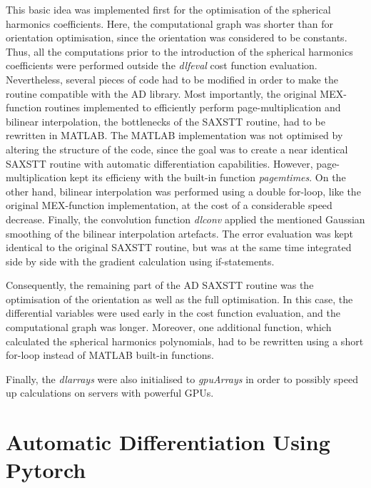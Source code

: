 This basic idea was implemented first for the optimisation of the spherical harmonics coefficients.
Here, the computational graph was shorter than for orientation optimisation, since the orientation was considered to be constants.
Thus, all the computations prior to the introduction of the spherical harmonics coefficients were performed outside the \emph{dlfeval} cost function evaluation.
Nevertheless, several pieces of code had to be modified in order to make the routine compatible with the AD library.
Most importantly, the original MEX-function routines implemented to efficiently perform page-multiplication and bilinear interpolation, the bottlenecks of the SAXSTT routine, had to be rewritten in MATLAB.
The MATLAB implementation was not optimised by altering the structure of the code, since the goal was to create a near identical SAXSTT routine with automatic differentiation capabilities.
However, page-multiplication kept its efficieny with the built-in function \emph{pagemtimes}.
On the other hand, bilinear interpolation was performed using a double for-loop, like the original MEX-function implementation, at the cost of a considerable speed decrease.
Finally, the convolution function \emph{dlconv} applied the mentioned Gaussian smoothing of the bilinear interpolation artefacts. %
The error evaluation was kept identical to the original SAXSTT routine, but was at the same time integrated side by side with the gradient calculation using if-statements.

Consequently, the remaining part of the AD SAXSTT routine was the optimisation of the orientation as well as the full optimisation.
In this case, the differential variables were used early in the cost function evaluation, and the computational graph was longer.
Moreover, one additional function, which calculated the spherical harmonics polynomials, had to be rewritten using a short for-loop instead of MATLAB built-in functions.

Finally, the \emph{dlarrays} were also initialised to \emph{gpuArrays} in order to possibly speed up calculations on servers with powerful GPUs.


\section{Automatic Differentiation Using Pytorch}\label{sec:AD_pytorch}

